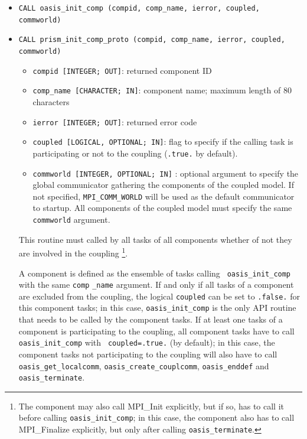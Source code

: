 \begin{itemize}

\item {\tt CALL oasis\_init\_comp (compid, comp\_name, ierror, coupled, commworld)}
\item {\tt CALL prism\_init\_comp\_proto (compid, comp\_name, ierror, coupled, commworld)}

  \begin{itemize}
  \item {\tt compid [INTEGER; OUT]}: returned component ID
  \item {\tt comp\_name [CHARACTER; IN]}: component name; maximum length of 80 characters 
  \item {\tt ierror [INTEGER; OUT]}: returned error code
  \item {\tt coupled [LOGICAL, OPTIONAL; IN]}: flag to specify if the calling task is participating or not to the coupling ({\tt .true.} by default). 
  \item {\tt commworld [INTEGER, OPTIONAL; IN]} : optional argument to specify the global communicator gathering the components of the coupled model. 
  If not specified, {\tt MPI\_COMM\_WORLD} will be used as the default communicator to startup. All components of the coupled model must 
  specify the same {\tt commworld} argument.

  \end{itemize}
 
  This routine must called by all tasks of all components whether of not they are involved in the coupling \footnote{The component may also call MPI\_Init explicitly, but if so, has to call it before calling {\tt oasis\_init\_comp}; in this case, the component also has to call MPI\_Finalize explicitly, but only after calling {\tt oasis\_terminate}.}. 

A component is defined as the ensemble of tasks  calling {\tt
  oasis\_init\_comp} with the same {\tt comp} {\tt \_name}
argument. If and only if all tasks of a component are excluded from
the coupling, the logical {\tt coupled} can be set to {\tt .false.}
for this component tasks; in this case, {\tt oasis\_init\_comp} is the
only API routine that needs to be called by the component tasks. If at
least one tasks of a component is participating to the coupling, all
component tasks have to call {\tt oasis\_init\_comp} with {\tt
  coupled=.true.} (by default); in this case, the component tasks not
participating to the coupling will also have to call
{\tt oasis\_get\_localcomm}, {\tt oasis\_create\_couplcomm}, {\tt oasis\_enddef} and {\tt oasis\_terminate}.
\end{itemize}

